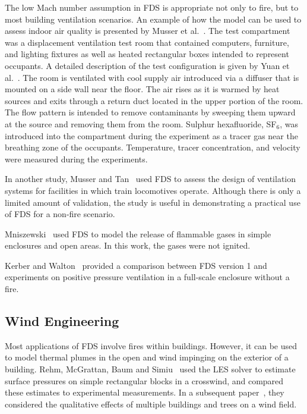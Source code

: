 The low Mach number assumption in FDS is appropriate not only to fire, but to most building ventilation scenarios. An example of how the model can be used to assess indoor air quality is presented by Musser et al.~\cite{Musser:1}.  The test compartment was a displacement ventilation test  room  that contained  computers, furniture, and lighting fixtures as well as heated rectangular boxes intended to represent occupants. A detailed description of the test configuration is given by Yuan et al.~\cite{Yuan:1}. The room is ventilated with cool supply air introduced via a diffuser that is mounted on a side wall near the floor. The air rises as it is warmed by heat sources and exits through a return duct located in the upper portion of the room. The  flow pattern is intended to remove contaminants by sweeping them upward at the source and removing them from the room. Sulphur hexafluoride, SF$_6$, was introduced into the compartment during the experiment as a tracer gas near the breathing zone of the  occupants.  Temperature, tracer concentration, and velocity were measured during the experiments.

In another study, Musser and Tan~\cite{Musser:2} used FDS to assess the design of ventilation systems for facilities in which train locomotives operate. Although there is only a limited amount of validation, the study is useful in demonstrating a practical use of FDS for a non-fire scenario.

Mniszewski~\cite{Mniszewski:1} used FDS to model the release of flammable gases in simple enclosures and open areas. In this work, the gases were not ignited.

Kerber and Walton~\cite{Kerber:1} provided a comparison between FDS version 1 and experiments on positive pressure ventilation in a full-scale enclosure without a fire.


\subsection{Wind Engineering}

Most applications of FDS involve fires within buildings. However, it can be used to model thermal plumes in the open and wind impinging on the exterior  of  a  building.  Rehm,  McGrattan,  Baum  and Simiu~\cite{LES:4} used the LES solver to estimate surface pressures on simple rectangular blocks in a crosswind, and compared these estimates to experimental measurements. In a subsequent paper~\cite{Rehm:WS02}, they considered the qualitative effects of multiple buildings and trees on a wind field.

